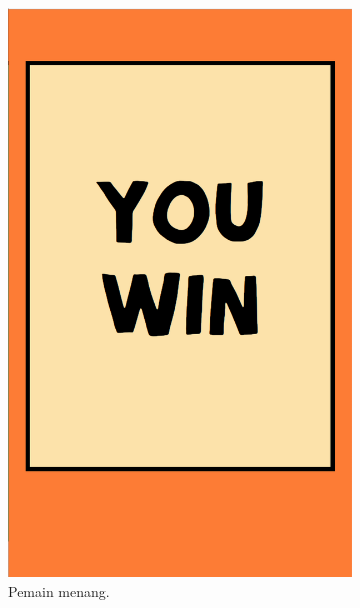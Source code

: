 \begin{enumerate}
	\begin{figure}[H]
		\begin{subfigure}{.5\textwidth}
			\centering
			\includegraphics[scale=0.2]{Gambar/realPhone5_over2}
			\caption{Pemain menang.}
			\label{subfig:realPhone5_over2}
		\end{subfigure}
		\begin{subfigure}{.5\textwidth}
			\centering

\end{subfigure}
\end{figure}
\end{enumerate}

